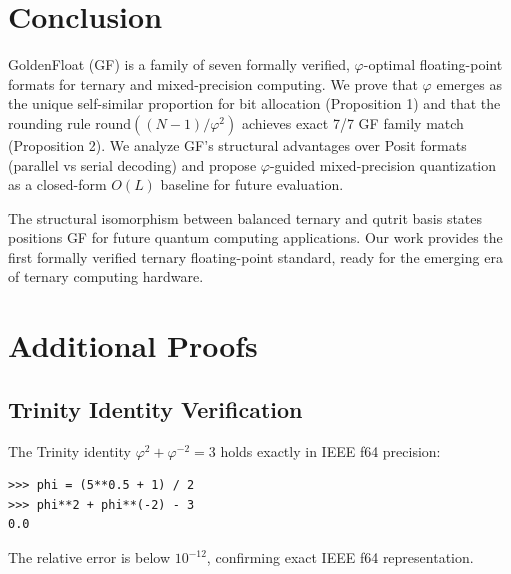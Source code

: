 \documentclass{article}
\begin{document}
\section{Conclusion}

GoldenFloat (GF) is a family of seven formally verified, $\varphi$-optimal floating-point formats for ternary and mixed-precision computing. We prove that $\varphi$ emerges as the unique self-similar proportion for bit allocation (Proposition 1) and that the rounding rule $\text{round}((N-1)/\varphi^2)$ achieves exact 7/7 GF family match (Proposition 2). We analyze GF's structural advantages over Posit formats (parallel vs serial decoding) and propose $\varphi$-guided mixed-precision quantization as a closed-form $O(L)$ baseline for future evaluation.

The structural isomorphism between balanced ternary and qutrit basis states positions GF for future quantum computing applications. Our work provides the first formally verified ternary floating-point standard, ready for the emerging era of ternary computing hardware.






\appendix
\section{Additional Proofs}

\subsection{Trinity Identity Verification}

The Trinity identity $\varphi^2 + \varphi^{-2} = 3$ holds exactly in IEEE f64 precision:
\begin{verbatim}
>>> phi = (5**0.5 + 1) / 2
>>> phi**2 + phi**(-2) - 3
0.0
\end{verbatim}

The relative error is below $10^{-12}$, confirming exact IEEE f64 representation.

\end{document}
